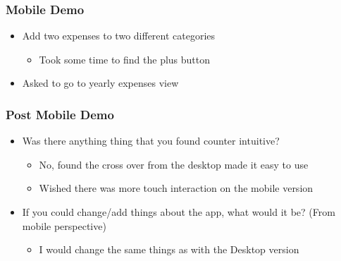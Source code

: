 \documentclass{chi2011}
\begin{document}
\begin{itemize}[noitemsep]
	
	\subsubsection{Mobile Demo}
	\begin{itemize}[noitemsep] 
		\item Add two expenses to two different categories
		\begin{itemize}[noitemsep]
				\item Took some time to find the plus button
		\end{itemize}
	\item Asked to go to yearly expenses view
	\end{itemize}

	\subsubsection{Post Mobile Demo}
	\begin{itemize}[noitemsep]
		\item Was there anything thing that you found counter intuitive?
		\begin{itemize}[noitemsep]
			\item No, found the cross over from the desktop made it easy to use
			\item Wished there was more touch interaction on the mobile version
		\end{itemize}
		\item If you could change/add things about the app, what would it be? (From mobile perspective)
		\begin{itemize}[noitemsep]
				\item I would change the same things as with the Desktop version
		\end{itemize}
	\end{itemize}



\end{itemize}
\end{document}
